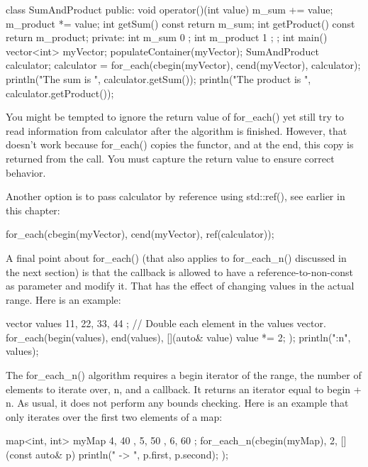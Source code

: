 \begin{cpp}
class SumAndProduct
{
    public:
        void operator()(int value)
        {
            m_sum += value;
            m_product *= value;
        }
        int getSum() const { return m_sum; }
        int getProduct() const { return m_product; }
    private:
        int m_sum { 0 };
        int m_product { 1 };
};
int main()
{
    vector<int> myVector;
    populateContainer(myVector);
    SumAndProduct calculator;
    calculator = for_each(cbegin(myVector), cend(myVector), calculator);
    println("The sum is {}", calculator.getSum());
    println("The product is {}", calculator.getProduct());
}
\end{cpp}

You might be tempted to ignore the return value of for\_each() yet still try to read information from calculator after the algorithm is finished. However, that doesn’t work because for\_each() copies the functor, and at the end, this copy is returned from the call. You must capture the return value to ensure correct behavior.

Another option is to pass calculator by reference using std::ref(), see earlier in this chapter:

\begin{cpp}
for_each(cbegin(myVector), cend(myVector), ref(calculator));
\end{cpp}

A final point about for\_each() (that also applies to for\_each\_n() discussed in the next section) is that the callback is allowed to have a reference-to-non-const as parameter and modify it. That has the effect of changing values in the actual range. Here is an example:

\begin{cpp}
vector values { 11, 22, 33, 44 };
// Double each element in the values vector.
for_each(begin(values), end(values), [](auto& value) { value *= 2; });
println("{:n}", values);
\end{cpp}


The for\_each\_n() algorithm requires a begin iterator of the range, the number of elements to iterate over, n, and a callback. It returns an iterator equal to begin + n. As usual, it does not perform any bounds checking. Here is an example that only iterates over the first two elements of a map:

\begin{cpp}
map<int, int> myMap { { 4, 40 }, { 5, 50 }, { 6, 60 } };
for_each_n(cbegin(myMap), 2, [](const auto& p)
    { println("{} -> {}", p.first, p.second); });
\end{cpp}

